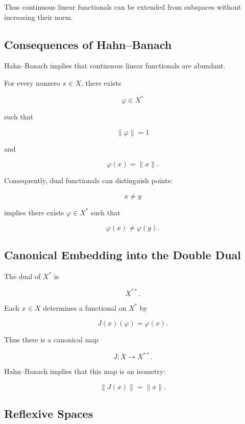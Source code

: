 Thus continuous linear functionals can be extended from subspaces without
increasing their norm.

\subsection{Consequences of Hahn--Banach}
\label{subsec:hahn-banach-consequences}

Hahn--Banach implies that continuous linear functionals are abundant.

For every nonzero \(x\in X\), there exists

\[
\varphi\in X^*
\]

such that

\[
\boxed{
\|\varphi\|=1
}
\]

and

\[
\boxed{
\varphi(x)=\|x\|.
}
\]

Consequently, dual functionals can distinguish points:

\[
x\neq y
\]

implies there exists \(\varphi\in X^*\) such that

\[
\boxed{
\varphi(x)\neq\varphi(y).
}
\]

\subsection{Canonical Embedding into the Double Dual}
\label{subsec:double-dual-embedding}

The dual of \(X^*\) is

\[
X^{**}.
\]

Each \(x\in X\) determines a functional on \(X^*\) by

\[
\boxed{
J(x)(\varphi)
=
\varphi(x).
}
\]

Thus there is a canonical map

\[
\boxed{
J:X\to X^{**}.
}
\]

Hahn--Banach implies that this map is an isometry:

\[
\boxed{
\|J(x)\|=\|x\|.
}
\]

\subsection{Reflexive Spaces}
\label{subsec:reflexive-spaces}

